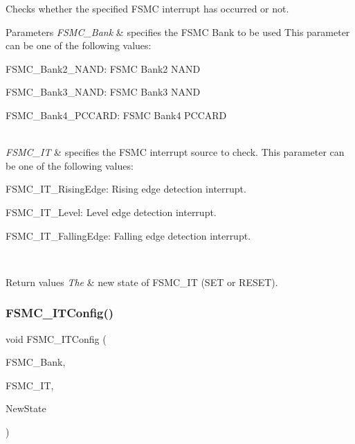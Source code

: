 Checks whether the specified F\+S\+MC interrupt has occurred or not. 


\begin{DoxyParams}{Parameters}
{\em F\+S\+M\+C\+\_\+\+Bank} & specifies the F\+S\+MC Bank to be used This parameter can be one of the following values\+: \begin{DoxyItemize}
\item F\+S\+M\+C\+\_\+\+Bank2\+\_\+\+N\+A\+ND\+: F\+S\+MC Bank2 N\+A\+ND \item F\+S\+M\+C\+\_\+\+Bank3\+\_\+\+N\+A\+ND\+: F\+S\+MC Bank3 N\+A\+ND \item F\+S\+M\+C\+\_\+\+Bank4\+\_\+\+P\+C\+C\+A\+RD\+: F\+S\+MC Bank4 P\+C\+C\+A\+RD \end{DoxyItemize}
\\
\hline
{\em F\+S\+M\+C\+\_\+\+IT} & specifies the F\+S\+MC interrupt source to check. This parameter can be one of the following values\+: \begin{DoxyItemize}
\item F\+S\+M\+C\+\_\+\+I\+T\+\_\+\+Rising\+Edge\+: Rising edge detection interrupt. \item F\+S\+M\+C\+\_\+\+I\+T\+\_\+\+Level\+: Level edge detection interrupt. \item F\+S\+M\+C\+\_\+\+I\+T\+\_\+\+Falling\+Edge\+: Falling edge detection interrupt. \end{DoxyItemize}
\\
\hline
\end{DoxyParams}

\begin{DoxyRetVals}{Return values}
{\em The} & new state of F\+S\+M\+C\+\_\+\+IT (S\+ET or R\+E\+S\+ET). \\
\hline
\end{DoxyRetVals}
\mbox{\label{group___f_s_m_c___exported___functions_ga217027ae3cd213b9076b6a1be197064c}} 
\subsubsection{\texorpdfstring{FSMC\_ITConfig()}{FSMC\_ITConfig()}}
{\footnotesize\ttfamily void F\+S\+M\+C\+\_\+\+I\+T\+Config (\begin{DoxyParamCaption}\item[{uint32\+\_\+t}]{F\+S\+M\+C\+\_\+\+Bank,  }\item[{uint32\+\_\+t}]{F\+S\+M\+C\+\_\+\+IT,  }\item[{\mbox{\hyperlink{group___exported__types_gac9a7e9a35d2513ec15c3b537aaa4fba1}{Functional\+State}}}]{New\+State }\end{DoxyParamCaption})}



